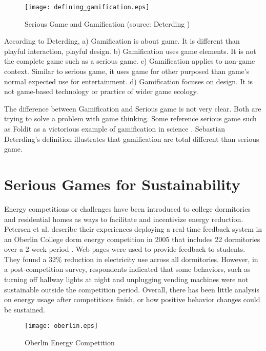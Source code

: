 \begin{figure}[htbp]
	\centering
		\texttt{[image: defining\_gamification.eps]}
		\caption{Serious Game and Gamification (source: Deterding \cite{Deterding2011mt})}
		\label{fig:define_gamification}
\end{figure}

According to Deterding, a) Gamification is about game. It is different than playful interaction, playful design. b) Gamification uses game elements. It is not the complete game such as a serious game. c) Gamification applies to non-game context. Similar to serious game, it uses game for other purposed than game's normal expected use for entertainment. d) Gamification focuses on design. It is not game-based technology or practice of wider game ecology.

The difference between Gamification and Serious game is not very clear. Both are trying to solve a problem with game thinking. Some reference serious game such as Foldit as a victorious example of gamification in science \cite{bosch2011}. Sebastian Deterding's definition \cite {Deterding2011mt} illustrates that gamification are total different than serious game.

\section{Serious Games for Sustainability}

Energy competitions or challenges have been introduced to college dormitories
and residential homes as ways to facilitate and incentivize energy reduction.
Petersen et al. describe their experiences deploying a real-time feedback
system in an Oberlin College dorm energy competition in 2005 that includes 22
dormitories over a 2-week period \cite{petersen-dorm-energy-reduction}. Web
pages were used to provide feedback to students. They found a 32\% reduction in
electricity use across all dormitories. However, in a post-competition survey,
respondents indicated that some behaviors, such as turning off hallway lights
at night and unplugging vending machines were not sustainable outside the
competition period.  Overall, there has been little analysis on energy usage
after competitions finish, or how positive behavior changes could be sustained.

\begin{figure}[htbp]
	\centering
		\texttt{[image: oberlin.eps]}
		\caption{Oberlin Energy Competition}
		\label{fig:oberlin}
\end{figure}

